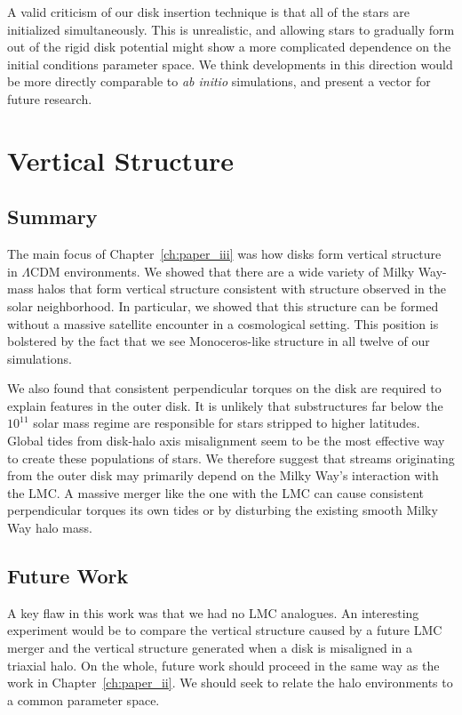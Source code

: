 A valid criticism of our disk insertion technique is that all of the stars are initialized simultaneously. This is unrealistic, and allowing stars to gradually form out of the rigid disk potential might show a more complicated dependence on the initial conditions parameter space. We think developments in this direction would be more directly comparable to \textit{ab initio} simulations, and present a vector for future research.


\section{Vertical Structure}
\subsection{Summary}

The main focus of Chapter~\ref{ch:paper_iii} was how disks form vertical structure in $\Lambda$CDM environments. We showed that there are a wide variety of Milky Way-mass halos that form vertical structure consistent with structure observed in the solar neighborhood. In particular, we showed that this structure can be formed without a massive satellite encounter in a cosmological setting. This position is bolstered by the fact that we see Monoceros-like structure in all twelve of our simulations.

We also found that consistent perpendicular torques on the disk are required to explain features in the outer disk. It is unlikely that substructures far below the $10^{11}$ solar mass regime are responsible for stars stripped to higher latitudes. Global tides from disk-halo axis misalignment seem to be the most effective way to create these populations of stars. We therefore suggest that streams originating from the outer disk may primarily depend on the Milky Way's interaction with the LMC. A massive merger like the one with the LMC can cause consistent perpendicular torques its own tides or by disturbing the existing smooth Milky Way halo mass. 

\subsection{Future Work}

A key flaw in this work was that we had no LMC analogues. An interesting experiment would be to compare the vertical structure caused by a future LMC merger and the vertical structure generated when a disk is misaligned in a triaxial halo. On the whole, future work should proceed in the same way as the work in Chapter~\ref{ch:paper_ii}. We should seek to relate the halo environments to a common parameter space.

